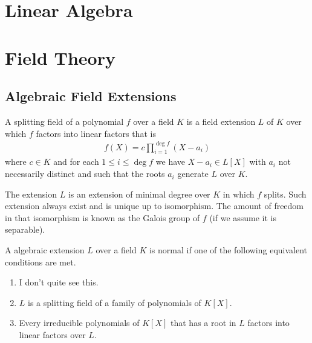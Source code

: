 \part{Linear Algebra}

\part{Field Theory}

\chapter{Algebraic Field Extensions}
\begin{defbox}
    \begin{definition}
        A splitting field of a polynomial \(f\) over a field \(K\) is a field extension \(L\) of \(K\) over which \(f\) factors into linear factors that is
        \begin{align*}
            f(X) = c \prod_{i=1}^{\deg f} (X - a_i)
        \end{align*}
        where \(c \in K\) and for each \(1 \leq i \leq \deg f\) we have \(X - a_i \in L[X]\) with \(a_i\) not necessarily distinct and such that the roots \(a_i\) generate \(L\) over \(K\).
    \end{definition}
\end{defbox}
\begin{remark}
    The extension \(L\) is an extension of minimal degree over \(K\) in which \(f\) splits. Such extension always exist and is unique up to isomorphism. The amount of freedom in that isomorphism is known as the Galois group of \(f\) (if we assume it is separable).
\end{remark}

\begin{defbox}
    \begin{definition}
        A algebraic extension \(L\) over a field \(K\) is normal if one of the following equivalent conditions are met.
        \begin{enumerate}
            \item I don't quite see this.
            \item \(L\) is a splitting field of a family of polynomials of \(K[X]\).
            \item Every irreducible polynomials of \(K[X]\) that has a root in \(L\) factors into linear factors over \(L\).
        \end{enumerate}
    \end{definition}
\end{defbox}

